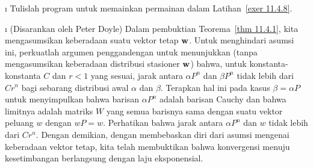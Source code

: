 \begin{LJSItem}
\i\label{exer 11.4.9} Tulislah program untuk memainkan permainan dalam Latihan~\ref{exer
11.4.8}.

\i\label{exer 11.4.10} (Disarankan oleh Peter Doyle) Dalam
pembuktian Teorema~\ref{thm 11.4.1}, kita mengasumsikan keberadaan suatu vektor
tetap ${\mbox{\bf w}\/}$. Untuk menghindari asumsi ini, perkuatlah argumen penggandengan
untuk menunjukkan (tanpa mengasumsikan keberadaan distribusi stasioner
${\mbox{\bf w}\/}$) bahwa, untuk konstanta-konstanta $C$ dan $r<1$ yang sesuai, jarak antara
$\alpha P^n$ dan $\beta P^n$ tidak lebih dari $C r^n$ bagi sebarang distribusi awal
$\alpha$ dan $\beta$. Terapkan hal ini pada kasus $\beta = \alpha P$ untuk
menyimpulkan bahwa barisan $\alpha P^n$ adalah barisan Cauchy dan bahwa limitnya
adalah matriks $W$ yang semua barisnya sama dengan suatu vektor peluang $w$
dengan $wP=w$. Perhatikan bahwa jarak antara $\alpha P^n$ dan $w$ tidak lebih dari
$C r^n$. Dengan demikian, dengan membebaskan diri dari asumsi mengenai keberadaan
vektor tetap, kita telah membuktikan bahwa konvergensi menuju kesetimbangan
berlangsung dengan laju eksponensial.
\end{LJSItem}

